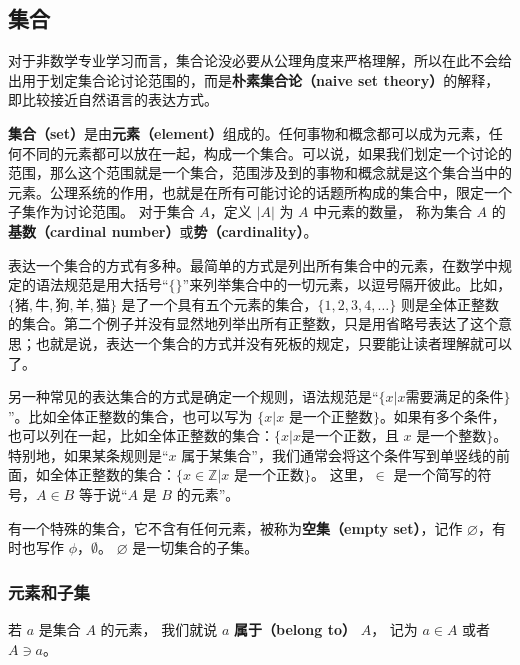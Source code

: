 

\subsection{集合}

对于非数学专业学习而言，集合论没必要从公理角度来严格理解，所以在此不会给出用于划定集合论讨论范围的，而是\textbf{朴素集合论（naive set theory）}的解释，即比较接近自然语言的表达方式。

\textbf{集合（set）}是由\textbf{元素（element）}组成的。任何事物和概念都可以成为元素，任何不同的元素都可以放在一起，构成一个集合。可以说，如果我们划定一个讨论的范围，那么这个范围就是一个集合，范围涉及到的事物和概念就是这个集合当中的元素。公理系统的作用，也就是在所有可能讨论的话题所构成的集合中，限定一个子集作为讨论范围。 对于集合 $A$，定义 $|A|$ 为 $A$ 中元素的数量， 称为集合 $A$ 的\textbf{基数（cardinal number）}或\textbf{势（cardinality）}。

表达一个集合的方式有多种。最简单的方式是列出所有集合中的元素，在数学中规定的语法规范是用大括号“$\{\}$”来列举集合中的一切元素，以逗号隔开彼此。比如，$\{\text{猪}, \text{牛}, \text{狗}, \text{羊}, \text{猫}\}$ 是了一个具有五个元素的集合，$\{1,2,3,4,\dots\}$ 则是全体正整数的集合。第二个例子并没有显然地列举出所有正整数，只是用省略号表达了这个意思；也就是说，表达一个集合的方式并没有死板的规定，只要能让读者理解就可以了。

另一种常见的表达集合的方式是确定一个规则，语法规范是“$\{x|x \text{需要满足的条件}\}$”。比如全体正整数的集合，也可以写为 $\{x|\text{$x$ 是一个正整数}\}$。如果有多个条件，也可以列在一起，比如全体正整数的集合：$\{x|x \text{是一个正数，且 $x$ 是一个整数}\}$。特别地，如果某条规则是“$x$ 属于某集合”，我们通常会将这个条件写到单竖线的前面，如全体正整数的集合：$\{x\in\mathbb{Z}|\text{$x$ 是一个正数}\}$。 这里，$\in$ 是一个简写的符号，$A\in B$ 等于说“$A$ 是 $B$ 的元素”。

有一个特殊的集合，它不含有任何元素，被称为\textbf{空集（empty set）}，记作 $\varnothing$，有时也写作 $\phi$，$\emptyset$。 $\varnothing$ 是一切集合的子集。

\subsubsection{元素和子集}
若 $a$ 是集合 $A$ 的元素， 我们就说 $a$ \textbf{属于（belong to）} $A$， 记为 $a \in A$ 或者 $A \ni a$。

